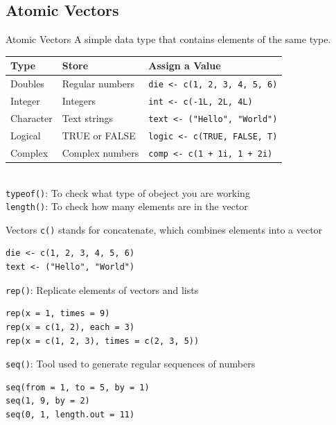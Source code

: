 \documentclass{beamer} %
\begin{document}
\subsection{Atomic Vectors}
\begin{frame}{Atomic Vectors} 
    A simple data type that contains elements of the same type. \\
  \begin{tabular}{lll} 
    \toprule
    \textbf{Type} & \textbf{Store}      & \textbf{Assign a Value}               \\
    \midrule
    Doubles      & Regular numbers     & \texttt{die <- c(1, 2, 3, 4, 5, 6)}    \\
    Integer      & Integers            & \texttt{int <- c(-1L, 2L, 4L)}         \\
    Character    & Text strings        & \texttt{text <- ("Hello", "World")}    \\
    Logical      & TRUE or FALSE       & \texttt{logic <- c(TRUE, FALSE, T)}    \\
    Complex      & Complex numbers     & \texttt{comp <- c(1 + 1i, 1 + 2i)}     \\
    \bottomrule
  \end{tabular} \\
  \vspace{20pt}
  \texttt{typeof()}: To check what type of obeject you are working \\
  \texttt{length()}: To check how many elements are in the vector
\end{frame}

\begin{frame}[fragile]{Vectors}  
  \texttt{c()} stands for concatenate, which combines elements into a vector
  \begin{lstlisting}
die <- c(1, 2, 3, 4, 5, 6)
text <- ("Hello", "World")
  \end{lstlisting}

  \texttt{rep()}: Replicate elements of vectors and lists
  \begin{lstlisting}
rep(x = 1, times = 9)
rep(x = c(1, 2), each = 3)
rep(x = c(1, 2, 3), times = c(2, 3, 5))
  \end{lstlisting}

  \texttt{seq()}: Tool used to generate regular sequences of numbers
  \begin{lstlisting}
seq(from = 1, to = 5, by = 1)
seq(1, 9, by = 2)
seq(0, 1, length.out = 11)
  \end{lstlisting}
\end{frame}
\end{document}
